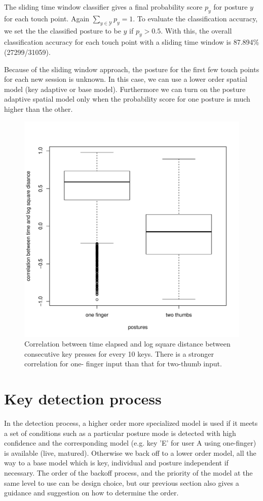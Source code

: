 \documentclass{sigchi}
\begin{document}
The sliding time window classifier gives a final probability score $p_y$ for posture
$y$ for each touch point. Again $\displaystyle\sum_{y\in \mathcal{Y}}p_y = 1$. To evaluate the classification accuracy, we set the the
classified posture to be $y$ if $p_y > 0.5$. With this, the overall classification 
accuracy for each touch point with a sliding time window
is 87.894\% (27299/31059).

Because of the sliding window approach, the posture for the first few touch points  
for each new session is unknown. In this case, we can use a lower order spatial 
model (key adaptive or base model). Furthermore  we can turn on the posture 
adaptive spatial model only when the probability score for one posture is much 
higher than the other.

\begin{figure}[tb]
  \centering
  \includegraphics[width=1\columnwidth]{figures/boxplot.pdf}
  \caption{Correlation between time elapsed and log square distance between
  consecutive key presses for every 10 keys. There is a stronger correlation for
  one- finger input than that for two-thumb input.}
  \label{fig:boxplot}
\end{figure}


\section{Key detection process}\label{sec:key-detection-process}
In the detection process, a higher order more specialized model is used if it
meets a set of conditions such as a particular posture mode is detected with high 
confidence and the corresponding model (e.g. key 'E' for user A using
one-finger) is available (live, matured).
Otherwise we back off to a lower order model, all the way to a base model which 
is key, individual and posture independent if necessary. The order of the
backoff process, and the priority of the model at the same level to use can be
design choice, but our previous section also gives a guidance and suggestion on
how to determine the order.
\end{document}
